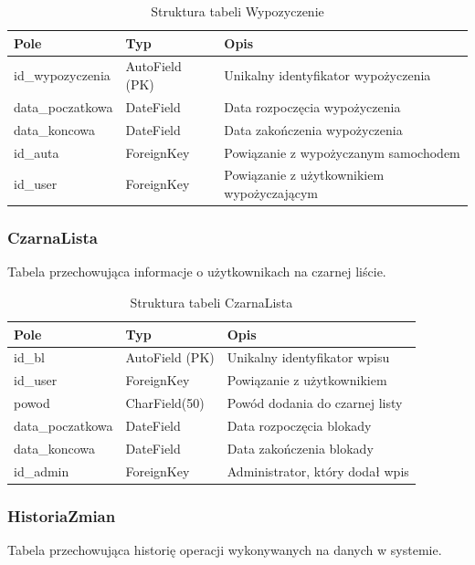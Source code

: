 \documentclass[12pt,a4paper]{article}
\begin{document}
\begin{table}[H]
\centering
\begin{tabular}{|l|l|p{7cm}|}
\hline
\textbf{Pole} & \textbf{Typ} & \textbf{Opis} \\
\hline
id\_wypozyczenia & AutoField (PK) & Unikalny identyfikator wypożyczenia \\
\hline
data\_poczatkowa & DateField & Data rozpoczęcia wypożyczenia \\
\hline
data\_koncowa & DateField & Data zakończenia wypożyczenia \\
\hline
id\_auta & ForeignKey & Powiązanie z wypożyczanym samochodem \\
\hline
id\_user & ForeignKey & Powiązanie z użytkownikiem wypożyczającym \\
\hline
\end{tabular}
\caption{Struktura tabeli Wypozyczenie}
\end{table}

\newpage

\subsubsection{CzarnaLista}
Tabela przechowująca informacje o użytkownikach na czarnej liście.

\begin{table}[H]
\centering
\begin{tabular}{|l|l|p{7cm}|}
\hline
\textbf{Pole} & \textbf{Typ} & \textbf{Opis} \\
\hline
id\_bl & AutoField (PK) & Unikalny identyfikator wpisu \\
\hline
id\_user & ForeignKey & Powiązanie z użytkownikiem \\
\hline
powod & CharField(50) & Powód dodania do czarnej listy \\
\hline
data\_poczatkowa & DateField & Data rozpoczęcia blokady \\
\hline
data\_koncowa & DateField & Data zakończenia blokady \\
\hline
id\_admin & ForeignKey & Administrator, który dodał wpis \\
\hline
\end{tabular}
\caption{Struktura tabeli CzarnaLista}
\end{table}

\subsubsection{HistoriaZmian}
Tabela przechowująca historię operacji wykonywanych na danych w systemie.
\end{document}
